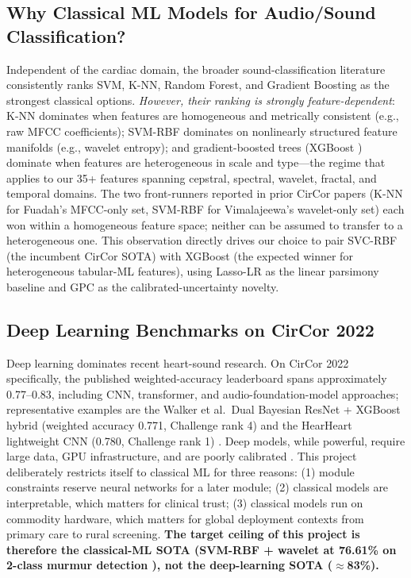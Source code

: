 \documentclass[10pt,twocolumn]{article}
\begin{document}
\subsection{Why Classical ML Models for Audio/Sound Classification?}

Independent of the cardiac domain, the broader sound-classification literature consistently ranks SVM, K-NN, Random Forest, and Gradient Boosting as the strongest classical options. \textit{However, their ranking is strongly feature-dependent}: K-NN dominates when features are homogeneous and metrically consistent (e.g., raw MFCC coefficients); SVM-RBF dominates on nonlinearly structured feature manifolds (e.g., wavelet entropy); and gradient-boosted trees (XGBoost \citep{chen2016xgboost}) dominate when features are heterogeneous in scale and type---the regime that applies to our 35+ features spanning cepstral, spectral, wavelet, fractal, and temporal domains. The two front-runners reported in prior CirCor papers (K-NN for Fuadah's MFCC-only set, SVM-RBF for Vimalajeewa's wavelet-only set) each won within a homogeneous feature space; neither can be assumed to transfer to a heterogeneous one. This observation directly drives our choice to pair SVC-RBF (the incumbent CirCor SOTA) with XGBoost (the expected winner for heterogeneous tabular-ML features), using Lasso-LR as the linear parsimony baseline and GPC as the calibrated-uncertainty novelty.

\subsection{Deep Learning Benchmarks on CirCor 2022}

Deep learning dominates recent heart-sound research. On CirCor 2022 specifically, the published weighted-accuracy leaderboard spans approximately 0.77--0.83, including CNN, transformer, and audio-foundation-model approaches; representative examples are the Walker et al.\ Dual Bayesian ResNet + XGBoost hybrid (weighted accuracy 0.771, Challenge rank 4) \citep{walker2022dbres} and the HearHeart lightweight CNN (0.780, Challenge rank 1) \citep{challenge2022}. Deep models, while powerful, require large data, GPU infrastructure, and are poorly calibrated \citep{guo2017}. This project deliberately restricts itself to classical ML for three reasons: (1) module constraints reserve neural networks for a later module; (2) classical models are interpretable, which matters for clinical trust; (3) classical models run on commodity hardware, which matters for global deployment contexts from primary care to rural screening. \textbf{The target ceiling of this project is therefore the classical-ML SOTA (SVM-RBF + wavelet at 76.61\% on 2-class murmur detection \citep{wavelet2025}), not the deep-learning SOTA ($\approx$83\%).}
\end{document}
